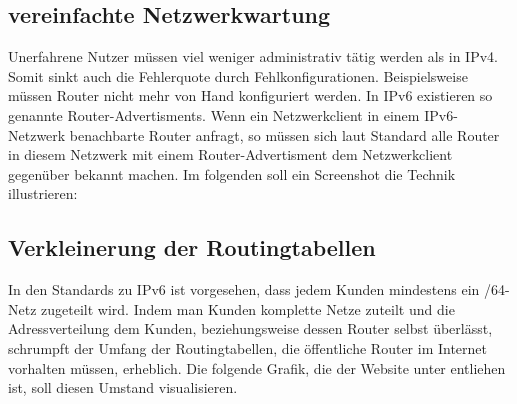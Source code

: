 \documentclass[a4paper,12pt]{scrartcl}
\begin{document}
\subsection{vereinfachte Netzwerkwartung}

Unerfahrene Nutzer m\"ussen viel weniger administrativ t\"atig werden als in IPv4. Somit sinkt auch die Fehlerquote durch Fehlkonfigurationen. Beispielsweise m\"ussen Router nicht mehr von Hand konfiguriert werden. In IPv6 existieren so genannte Router-Advertisments. Wenn ein Netzwerkclient in einem IPv6-Netzwerk benachbarte Router anfragt, so m\"ussen sich laut Standard alle Router in diesem Netzwerk mit einem Router-Advertisment dem Netzwerkclient gegen\"uber bekannt machen. Im folgenden soll ein Screenshot die Technik illustrieren:

\subsection{Verkleinerung der Routingtabellen}
In den Standards zu IPv6 ist vorgesehen, dass jedem Kunden mindestens ein /64-Netz zugeteilt wird. Indem man Kunden komplette Netze zuteilt und die Adressverteilung dem Kunden, beziehungsweise dessen Router selbst überlässt, schrumpft der Umfang der Routingtabellen, die öffentliche Router im Internet vorhalten müssen, erheblich. Die folgende Grafik, die der Website unter \cite{ipv4v6map} entliehen ist, soll diesen Umstand visualisieren.
\end{document}
